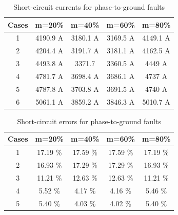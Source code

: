\documentclass[conference]{IEEEtran}
\begin{document}
\begin{table}[!hbt]
    \renewcommand{\arraystretch}{1.3}
	\caption{Short-circuit currents for phase-to-ground faults}
	\label{table:AT_CC}
	\centering
	\begin{tabular}{|c|c|c|c|c|}
		\hline
		\textbf{Cases} & \multicolumn{1}{l|}{\textbf{m=20\%}} & \multicolumn{1}{l|}{\textbf{m=40\%}} & \multicolumn{1}{l|}{\textbf{m=60\%}} & \multicolumn{1}{l|}{\textbf{m=80\%}} \\ \hline
		1              & 4190.9 A                              & 3180.1 A                              & 3169.5 A                              & 4149.1 A                              \\ \hline
		2              & 4204.4 A                              & 3191.7 A                              & 3181.1 A                              & 4162.5 A                              \\ \hline
		3              & 4493.8 A                              & 3371.7                                & 3360.5 A                              & 4449 A                                \\ \hline
		4              & 4781.7 A                              & 3698.4 A                              & 3686.1 A                              & 4737 A                                \\ \hline
		5              & 4787.8 A                              & 3703.8 A                              & 3691.5 A                              & 4740 A                                \\ \hline
		6              & 5061.1 A                              & 3859.2 A                              & 3846.3 A                              & 5010.7 A                              \\ \hline
	\end{tabular}
\end{table}

\begin{table}[!hbt]
	\renewcommand{\arraystretch}{1.3}
	\caption{Short-circuit errors for phase-to-ground faults}
	\label{table:AT_CC_E}
	\centering
	\begin{tabular}{|c|c|c|c|c|}
		\hline
		\textbf{Cases} & \textbf{m=20\%} & \textbf{m=40\%} & \textbf{m=60\%} & \textbf{m=80\%} \\ \hline
		1              & 17.19 \%         & 17.59 \%         & 17.59 \%         & 17.19 \%         \\ \hline
		2              & 16.93 \%         & 17.29 \%         & 17.29 \%         & 16.93 \%         \\ \hline
		3              & 11.21 \%         & 12.63 \%         & 12.63 \%         & 11.21 \%         \\ \hline
		4              & 5.52 \%          & 4.17 \%          & 4.16 \%          & 5.46 \%          \\ \hline
		5              & 5.40 \%          & 4.03 \%          & 4.02 \%          & 5.40 \%          \\ \hline
	\end{tabular}
\end{table}
\end{document}
